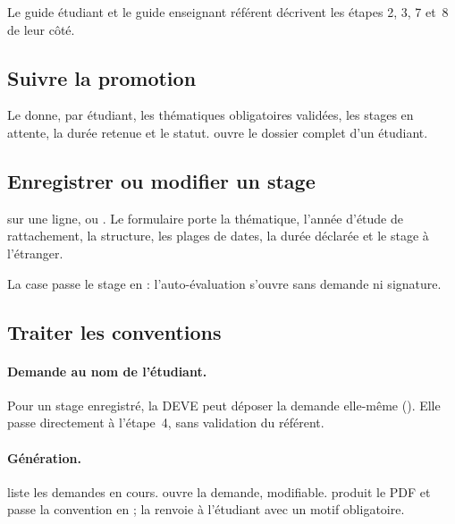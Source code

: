 \documentclass[11pt,a4paper]{article}
\begin{document}
Le guide étudiant et le guide enseignant référent décrivent les étapes 2, 3, 7
et~8 de leur côté.

\subsection{Suivre la promotion}

Le  donne, par étudiant, les thématiques
obligatoires validées, les stages en attente, la durée retenue et le statut.
 ouvre le dossier complet d'un étudiant.


\subsection{Enregistrer ou modifier un stage}

 sur une ligne, ou . Le formulaire porte la thématique, l'année d'étude de rattachement,
la structure, les plages de dates, la durée déclarée et le stage à l'étranger.

La case  passe le stage en  : l'auto-évaluation s'ouvre sans demande ni signature.


\subsection{Traiter les conventions}

\paragraph{Demande au nom de l'étudiant.} Pour un stage enregistré, la DEVE peut
déposer la demande elle-même (). Elle passe
directement à l'étape~4, sans validation du référent.


\paragraph{Génération.}  liste les demandes en
cours.  ouvre la demande, modifiable.
 produit le PDF et passe la convention en  ;
 la renvoie à l'étudiant avec un motif obligatoire.
\end{document}
